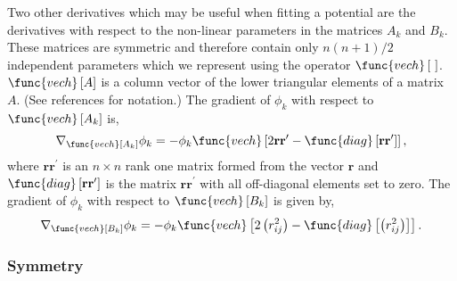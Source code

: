 \documentclass[12pt,thmsa]{article}
\begin{document}
Two other derivatives which may be useful when fitting a potential are the
derivatives with respect to the non-linear parameters in the matrices $A_k$
and $B_k$. These matrices are symmetric and therefore contain only $n\left(
n+1\right) /2$ independent parameters which we represent using the operator $%
\func{vech}\left[ \,\,\right] $. $\func{vech}\left[ A\right] $ is a column
vector of the lower triangular elements of a matrix $A.$ (See references for
notation.\cite{Kinghorn95a,Kinghorn95b}) The gradient of $\phi _k$ with
respect to $\func{vech}\left[ A_k\right] $ is, 
\begin{equation}
\nabla _{\func{vech}\left[ A_k\right] }\phi _k=-\phi _k\func{vech}\left[ 2%
\mathbf{rr}^{\prime }-\func{diag}\left[ \mathbf{rr}^{\prime }\right] \right]
,
\end{equation}
where $\mathbf{rr}^{\prime }$ is an $n\times n$ rank one matrix formed from
the vector $\mathbf{r}$ and $\func{diag}\left[ \mathbf{rr}^{\prime }\right] $
is the matrix $\mathbf{rr}^{\prime }$ with all off-diagonal elements set to
zero. The gradient of $\phi _k$ with respect to $\func{vech}\left[
B_k\right] $ is given by, 
\begin{equation}
\nabla _{\func{vech}\left[ B_k\right] }\phi _k=-\phi _k\func{vech}\left[
2\left( r_{ij}^2\right) -\func{diag}\left[ \left( r_{ij}^2\right) \right]
\right] .
\end{equation}

\subsubsection{Symmetry}
\end{document}
